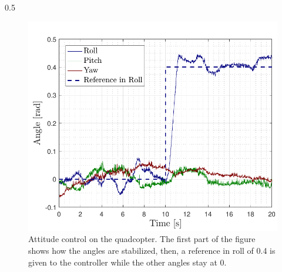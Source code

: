 \vspace{-2cm}
\begin{columns}[t,totalwidth=\twocolwid] %
		
		\begin{column}{0.5\twocolwid}%
  		\centering
			\begin{figure}
				\includegraphics[width=.9\linewidth]{figures/AttitudeControl}
				\caption{Attitude control on the quadcopter. The first part of the figure shows how the angles are stabilized, then, a reference in roll of 0.4 is given to the controller while the other angles stay at 0.}
			\end{figure}
		\end{column} %
		

\end{columns}

